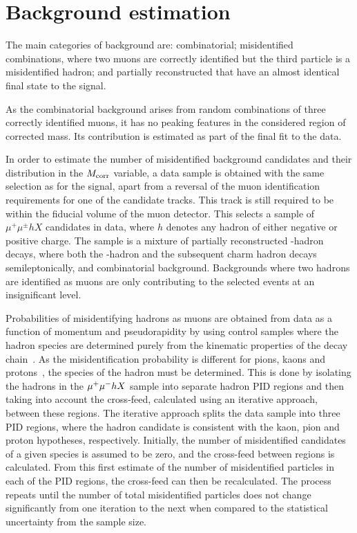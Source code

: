 \section{Background estimation}
\label{sec:Misid}
The main categories of background are: combinatorial; misidentified combinations, where two muons are correctly identified but the third particle is a misidentified hadron; and partially reconstructed that have an almost identical final state to the signal.

As the combinatorial background arises from random combinations of three correctly identified muons, it has no peaking features in the considered region of corrected mass. Its contribution is estimated as part of the final fit to the data.

In order to estimate the number of misidentified background candidates and their distribution in the $M_{\rm{corr}}$ variable, a
data sample is obtained with the same selection as for the signal, apart from
a reversal of the muon identification requirements for one of the candidate
tracks. This track is still required to be within the fiducial volume of the
muon detector. This selects a sample of $\mu^+\mu^\pm h X$ candidates in
data, where $h$ denotes any hadron of either negative or positive charge. The
sample is a mixture of partially reconstructed \bquark-hadron decays, where
both the \bquark-hadron and the subsequent charm hadron decays semileptonically,
and combinatorial background. Backgrounds where two hadrons are identified as
muons are only contributing to the selected events at an insignificant level.

Probabilities of misidentifying hadrons as muons are obtained from data as a function of momentum and pseudorapidity by using control samples where the hadron species are determined purely from the kinematic properties of the decay chain~\cite{LHCb-DP-2012-003}. As the misidentification probability is different for pions, kaons and protons~\cite{LHCb-DP-2013-001}, the species of the hadron must be determined.  This is done by isolating the hadrons in the ${\mu^+\mu^-} h X$ sample into separate hadron PID regions and then taking into account the cross-feed, calculated using an iterative approach, between these regions. The iterative approach splits the data sample into three PID regions, where the hadron candidate is consistent with the kaon, pion and proton hypotheses, respectively. Initially, the number of misidentified candidates of a given species is assumed to be zero, and the cross-feed between regions is calculated. From this first estimate of the number of misidentified particles in each of the PID regions, the cross-feed can then be recalculated. The process repeats until the number of total misidentified particles does not change significantly from one iteration to the next when compared to the statistical uncertainty from the sample size.

